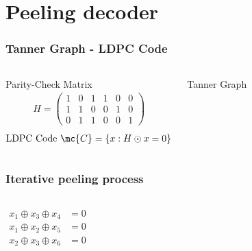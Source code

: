 \section{Peeling decoder}
\begin{frame}\frametitle{Tanner Graph - LDPC Code}
\begin{columns}

\begin{defn}{Parity-Check Matrix}
\centering
\begin{align*}
H=
\begin{pmatrix}
1 & 0 & 1 & 1 & 0 & 0\\
1 & 1 & 0 & 0 & 1 & 0\\
0 & 1 & 1 & 0 & 0 & 1
\end{pmatrix}
\end{align*}
\vspace{6ex}
\begin{align*}
\text{LDPC Code } \mc{C}=\{x: H\odot x=0 \}
\end{align*}
\end{defn}

\pause

\begin{defn}{Tanner Graph}
\centering
\vspace{0.6cm}
\resizebox{\textwidth}{!}{}
\end{defn}

\end{columns}
\end{frame}

\begin{frame}
\frametitle{Iterative peeling process}
\begin{columns}
\begin{align*}
x_1\oplus x_3\oplus x_4&=0\\
x_1\oplus x_2\oplus x_5&=0\\
x_2\oplus x_3\oplus x_6&=0
\end{align*}

\vspace{0.2cm}
\centering
{}

\resizebox{0.9\textwidth}{!}{}
\end{columns}
\end{frame}

